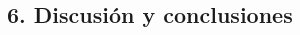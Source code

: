 \begin{spacing}{1.5}
  \begin{tightcenter}
    \section{6. Discusión y conclusiones}
    \mylinespacing
  \end{tightcenter}

  \mylinespacing
  \mylinespacing
  \begin{tightcenter}
  \end{tightcenter}
\end{spacing}
